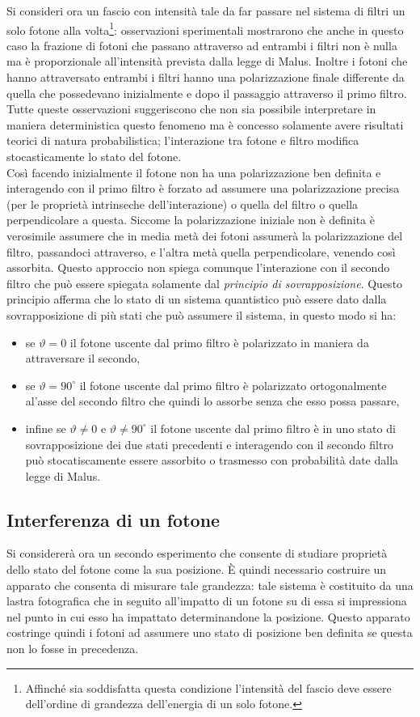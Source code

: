  Si consideri ora un fascio con intensità tale da far passare nel sistema di filtri un solo fotone alla volta\footnote{Affinché sia soddisfatta questa condizione l'intensità del fascio deve essere dell'ordine di grandezza dell'energia di un solo fotone.}: osservazioni sperimentali mostrarono che anche in questo caso la frazione di fotoni che passano attraverso ad entrambi i filtri non è nulla ma è proporzionale all'intensità prevista dalla legge di Malus. Inoltre i fotoni che hanno attraversato entrambi i filtri hanno una polarizzazione finale differente da quella che possedevano inizialmente e dopo il passaggio attraverso il primo filtro. Tutte queste osservazioni suggeriscono che non sia possibile interpretare in maniera deterministica questo fenomeno ma è concesso solamente avere risultati teorici di natura probabilistica; l'interazione tra fotone e filtro modifica stocasticamente lo stato del fotone.\\
Così facendo inizialmente il fotone non ha una polarizzazione ben definita e interagendo con il primo filtro è forzato ad assumere una polarizzazione precisa (per le proprietà intrinseche dell'interazione) o quella del filtro o quella perpendicolare a questa. Siccome la polarizzazione iniziale non è definita è verosimile assumere che in media metà dei fotoni assumerà la polarizzazione del filtro, passandoci attraverso, e l'altra metà quella perpendicolare, venendo così assorbita. Questo approccio non spiega comunque l'interazione con il secondo filtro che può essere spiegata solamente dal \emph{principio di sovrapposizione}. Questo principio afferma che lo stato di un sistema quantistico può essere dato dalla sovrapposizione di più stati che può assumere il sistema, in questo modo si ha:
\begin{itemize}
    \item se $\vartheta=0$ il fotone uscente dal primo filtro è polarizzato in maniera da attraversare il secondo,
    \item se $\vartheta=90^\circ$ il fotone uscente dal primo filtro è polarizzato ortogonalmente al'asse del secondo filtro che quindi lo assorbe senza che esso possa passare,
    \item infine se $\vartheta\neq0$ e $\vartheta\neq90^\circ$ il fotone uscente dal primo filtro è in uno stato di sovrapposizione dei due stati precedenti e interagendo con il secondo filtro può stocatiscamente essere assorbito o trasmesso con probabilità date dalla legge di Malus.
\end{itemize}
\subsection{Interferenza di un fotone}
Si considererà ora un secondo esperimento che consente di studiare proprietà dello stato del fotone come la sua posizione. È quindi necessario costruire un apparato che consenta di misurare tale grandezza: tale sistema è costituito da una lastra fotografica che in seguito all'impatto di un fotone su di essa si impressiona nel punto in cui esso ha impattato determinandone la posizione. Questo apparato costringe quindi i fotoni ad assumere uno stato di posizione ben definita se questa non lo fosse in precedenza.\\

